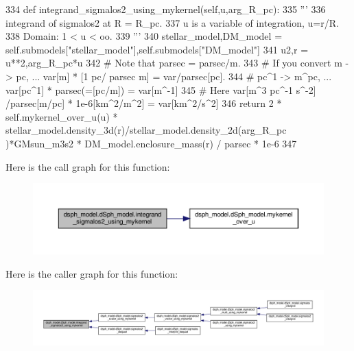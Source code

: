 \begin{DoxyCode}
334     \textcolor{keyword}{def }integrand\_sigmalos2\_using\_mykernel(self,u,arg\_R\_pc):
335         \textcolor{stringliteral}{'''}
336 \textcolor{stringliteral}{        integrand of sigmalos2 at R = R\_pc.}
337 \textcolor{stringliteral}{        u is a variable of integration, u=r/R.}
338 \textcolor{stringliteral}{        Domain: 1 < u < oo.}
339 \textcolor{stringliteral}{        '''}
340         stellar\_model,DM\_model = self.submodels[\textcolor{stringliteral}{"stellar\_model"}],self.submodels[\textcolor{stringliteral}{"DM\_model"}]
341         u2,r = u**2,arg\_R\_pc*u
342         \textcolor{comment}{# Note that parsec = parsec/m.}
343         \textcolor{comment}{# If you convert m -> pc,      ... var[m] * [1 pc/ parsec m] = var/parsec[pc].}
344         \textcolor{comment}{#                pc^1 -> m^pc, ... var[pc^1] * parsec(=[pc/m]) = var[m^-1]}
345         \textcolor{comment}{# Here var[m^3 pc^-1 s^-2] /parsec[m/pc] * 1e-6[km^2/m^2] = var[km^2/s^2]}
346         \textcolor{keywordflow}{return} 2 * self.mykernel\_over\_u(u) *  stellar\_model.density\_3d(r)/stellar\_model.density\_2d(arg\_R\_pc
      )*GMsun\_m3s2 * DM\_model.enclosure\_mass(r) / parsec * 1e-6
347 
\end{DoxyCode}
Here is the call graph for this function\+:\nopagebreak
\begin{figure}[H]
\begin{center}
\leavevmode
\includegraphics[width=350pt]{d0/d25/classdsph__model_1_1dSph__model_a5df6fa479eb9092d850da8779073eed5_cgraph}
\end{center}
\end{figure}
Here is the caller graph for this function\+:
\nopagebreak
\begin{figure}[H]
\begin{center}
\leavevmode
\includegraphics[width=350pt]{d0/d25/classdsph__model_1_1dSph__model_a5df6fa479eb9092d850da8779073eed5_icgraph}
\end{center}
\end{figure}
\mbox{\label{classdsph__model_1_1dSph__model_a5e0091742da19919dc6c085a806ad6e0}} 
